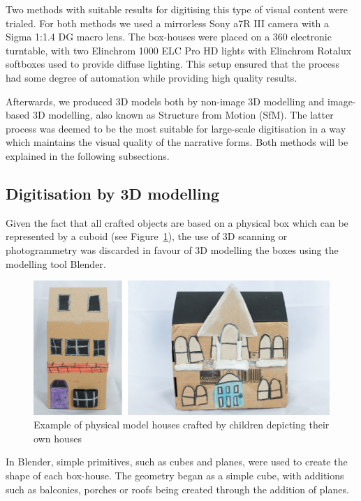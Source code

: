 \documentclass[acmlarge,screen,dvipsnames]{acmart}
\begin{document}
Two methods with suitable results for digitising this type of visual content were trialed. For both methods we used a mirrorless Sony a7R III camera with a Sigma 1:1.4 DG
macro lens. The box-houses were placed on a 360 electronic turntable, with two
Elinchrom 1000 ELC Pro HD lights with Elinchrom Rotalux softboxes used to
provide diffuse lighting. This setup ensured that the process had some degree of automation while providing
high quality results.

Afterwards, we produced 3D models both by non-image 3D modelling and image-based 3D modelling, also known as Structure from Motion (SfM). The latter process was deemed to be the most suitable for large-scale digitisation in a way which maintains the visual quality of the narrative forms. Both methods will be explained in the following subsections.

\subsection{Digitisation by 3D modelling}
Given the fact that all crafted objects are based on a physical box
which can be represented by a cuboid (see Figure~\ref{fig:boxes}), the use of
3D scanning or photogrammetry was discarded in favour of 3D modelling the
boxes using the modelling tool Blender\cite{blender}. 


\begin{figure}[ht] \centering
\includegraphics[width=0.7\linewidth]{images/boxes.png} \caption{Example
of physical model houses crafted by children depicting their own houses}
\label{fig:boxes} \end{figure}

In Blender, simple primitives, such as cubes and planes, were used
to create the shape of each box-house. The geometry began as
a simple cube, with additions such as balconies, porches or roofs being
created through the addition of planes.
\end{document}
